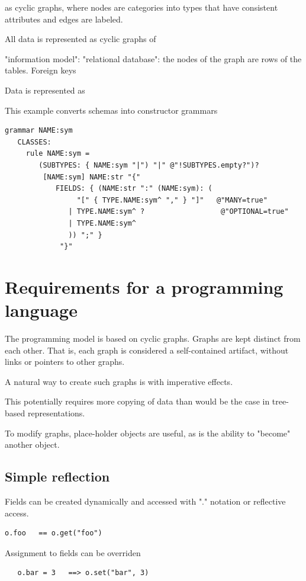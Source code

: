 \documentclass[11pt]{article}
\begin{document}
as cyclic graphs, where
nodes are categories into types that have 
consistent attributes and edges are labeled.

All data is represented as cyclic graphs of 


"information model": 
"relational database": the nodes of the graph are
rows of the tables. Foreign keys 

Data is represented as 



This example converts schemas into constructor grammars
\begin{verbatim}
grammar NAME:sym
   CLASSES:
     rule NAME:sym = 
        (SUBTYPES: { NAME:sym "|") "|" @"!SUBTYPES.empty?")?
         [NAME:sym] NAME:str "{" 
            FIELDS: { (NAME:str ":" (NAME:sym): (
                 "[" { TYPE.NAME:sym^ "," } "]"   @"MANY=true"
               | TYPE.NAME:sym^ ?                  @"OPTIONAL=true"
               | TYPE.NAME:sym^
               )) ";" }
             "}"
\end{verbatim}


\section{Requirements for a programming language}

The programming model is based on cyclic graphs.
Graphs are kept distinct from each other. That is,
each graph is considered a self-contained
artifact, without links or pointers to other graphs.

A natural way to create such graphs is with 
imperative effects.

This potentially requires more copying of data
than would be the case in tree-based representations.

To modify graphs, place-holder objects are useful,
as is the ability to "become" another object.

\subsection{Simple reflection}

Fields can be created dynamically and accessed with
"." notation or reflective access.

\begin{verbatim}
o.foo   == o.get("foo")
\end{verbatim}

Assignment to fields can be overriden
\begin{verbatim}
   o.bar = 3   ==> o.set("bar", 3)
\end{verbatim}
\end{document}
